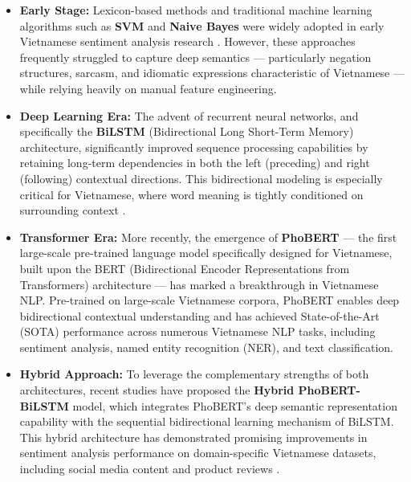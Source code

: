 \documentclass[12pt]{report} %
\begin{document}
\begin{itemize}
    \begin{itemize}
        \item \textbf{Early Stage:} Lexicon-based methods and traditional machine learning algorithms such as \textbf{SVM} and \textbf{Naive Bayes} were widely adopted in early Vietnamese sentiment analysis research \cite{nguyen2018vlsp}. However, these approaches frequently struggled to capture deep semantics --- particularly negation structures, sarcasm, and idiomatic expressions characteristic of Vietnamese --- while relying heavily on manual feature engineering.

        \item \textbf{Deep Learning Era:} The advent of recurrent neural networks, and specifically the \textbf{BiLSTM} (Bidirectional Long Short-Term Memory) architecture, significantly improved sequence processing capabilities by retaining long-term dependencies in both the left (preceding) and right (following) contextual directions. This bidirectional modeling is especially critical for Vietnamese, where word meaning is tightly conditioned on surrounding context \cite{pham2020sentiment}.

        \item \textbf{Transformer Era:} More recently, the emergence of \textbf{PhoBERT} \cite{nguyen2020phobert} --- the first large-scale pre-trained language model specifically designed for Vietnamese, built upon the BERT (Bidirectional Encoder Representations from Transformers) architecture --- has marked a breakthrough in Vietnamese NLP. Pre-trained on large-scale Vietnamese corpora, PhoBERT enables deep bidirectional contextual understanding and has achieved State-of-the-Art (SOTA) performance across numerous Vietnamese NLP tasks, including sentiment analysis, named entity recognition (NER), and text classification.

        \item \textbf{Hybrid Approach:} To leverage the complementary strengths of both architectures, recent studies have proposed the \textbf{Hybrid PhoBERT-BiLSTM} model, which integrates PhoBERT's deep semantic representation capability with the sequential bidirectional learning mechanism of BiLSTM. This hybrid architecture has demonstrated promising improvements in sentiment analysis performance on domain-specific Vietnamese datasets, including social media content and product reviews \cite{pham2020sentiment}.
    \end{itemize}


\end{itemize}
\end{document}
